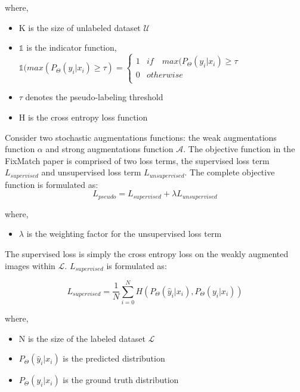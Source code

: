 where,
\begin{itemize}[label={}]
  \setlength\itemsep{0em}
  \item K is the size of unlabeled dataset $\mathcal{U}$
  \item $\mathbb{1}$ is the indicator function, $\mathbb{1}(max(P_{\Theta}(y_i | x_i) \geq \tau) = \begin{cases} 
      1 & if \quad max(P_{\Theta}(y_i | x_i) \geq \tau \\
      0 & otherwise \\
   \end{cases}$ 
   \item $\tau$ denotes the pseudo-labeling threshold 
   \item H is the cross entropy loss function
\end{itemize}
Consider two stochastic augmentations functions: the weak augmentations function $\alpha$ and strong augmentations function $\mathcal{A}$. The objective function in the FixMatch paper is comprised of two loss terms, the supervised loss term $L_{supervised}$ and unsupervised loss term $L_{unsupervised}$. The complete objective function is formulated as:
\begin{equation}
    \label{equation:fixmatch_loss}
    L_{pseudo} = L_{supervised} + \lambda L_{unsupervised}
\end{equation}

where,
\begin{itemize}[label={}]
  \setlength\itemsep{0em}
  \item $\lambda$ is the weighting factor for the unsupervised loss term
\end{itemize}

The supervised loss is simply the cross entropy loss on the weakly augmented images within $\mathcal{L}$. $L_{supervised}$ is formulated as:

\begin{equation}
    \label{equation:fixmatch_supervised_loss}
    L_{supervised} = \frac{1}{N} \sum_{i=0}^{N} H(P_{\Theta}(\hat{y}_i | x_i), P_{\Theta}(y_i | x_i))
\end{equation}

where,
\begin{itemize}[label={}]
  \setlength\itemsep{0em}
  \item N is the size of the labeled dataset $\mathcal{L}$
  \item $P_{\Theta}(\hat{y}_i | x_i)$ is the predicted distribution
  \item $P_{\Theta}(y_i | x_i)$ is the ground truth distribution
\end{itemize}

